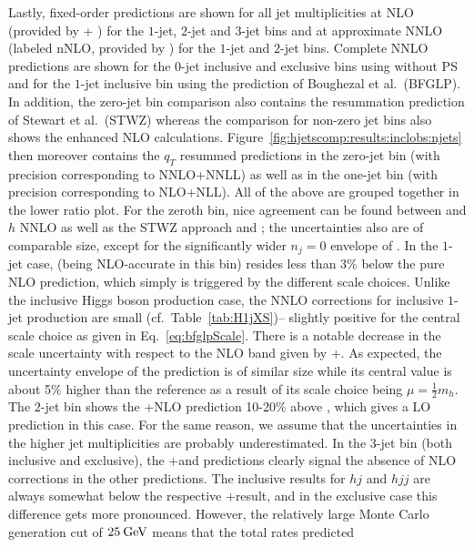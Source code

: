Lastly, fixed-order predictions are shown for all jet multiplicities
at NLO (provided by \GoSam{}+ \Sherpa) for the $1$-jet, $2$-jet and
$3$-jet bins and at approximate NNLO (labeled nNLO, provided by \Loopsim) 
for the $1$-jet and $2$-jet bins.
Complete NNLO predictions are shown for the $0$-jet inclusive and
exclusive bins using \Sherpa without PS and for the $1$-jet inclusive
bin using the prediction of Boughezal et al.~(BFGLP).
In addition, the zero-jet bin comparison
also contains the resummation prediction of Stewart et
al.~(STWZ) whereas the comparison for non-zero jet bins also
shows the \Minlo enhanced NLO calculations.
Figure~\ref{fig:hjetscomp:results:inclobs:njets} then moreover
contains the \Resbos $q_T$ resummed predictions in the zero-jet bin
(with precision corresponding to NNLO+NNLL) as well as in the
one-jet bin (with precision corresponding to NLO+NLL). All of the
above are grouped together in the lower ratio plot.
For the zeroth bin, nice agreement can be found between \Powheg and
\Sherpa $h$ NNLO as well as the STWZ approach and \Resbos; the
uncertainties also are of comparable size, except for the
significantly wider $n_j=0$ envelope of \Powheg.
In the $1$-jet case, \Powheg (being NLO-accurate in this bin)
resides less than 3\% below the pure NLO prediction, which simply is
triggered by the different scale choices. Unlike the inclusive Higgs
boson production case, the NNLO corrections for inclusive $1$-jet
production are small (cf.~Table~\ref{tab:H1jXS})-- slightly positive
for the central scale choice as given in Eq.~\eqref{eq:bfglpScale}.
There is a notable decrease in the scale uncertainty with respect to
the NLO band given by \GoSam{}+\Sherpa. As expected, the uncertainty
envelope of the \Resbos prediction is of similar size while its
central value is about 5\% higher than the reference as a result of
its scale choice being $\mu=\tfrac{1}{2}m_h$.
The $2$-jet bin shows the \GoSam{}+\Sherpa NLO prediction 10-20\%
above \Powheg, which gives a LO prediction in this case. For the same
reason, we assume that the \Powheg uncertainties in the higher jet
multiplicities are probably underestimated.
In the $3$-jet bin (both inclusive and exclusive), the
\GoSam{}+\Sherpa and \Sherpa \MEPSatNLO predictions clearly signal the
absence of NLO corrections in the other predictions. The \Loopsim
inclusive results for $hj$ and $hjj$ are always somewhat below the
respective \GoSam{}+\Sherpa result, and in the exclusive case this
difference gets more pronounced. However, the relatively large Monte
Carlo generation cut of $25\text{\:GeV}$ means that the total rates predicted
